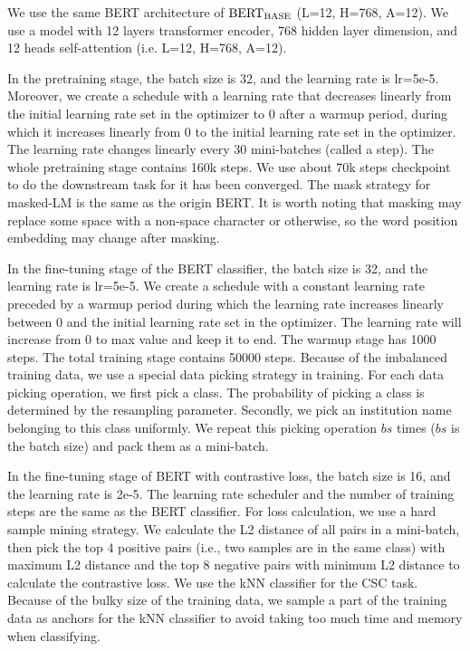 \documentclass{article}
\begin{document}
We use the same BERT architecture of $\rm{BERT_{BASE}}$ (L=12, H=768, A=12). We use a model with 12 layers transformer encoder, 768 hidden layer dimension, and 12 heads self-attention (i.e. L=12, H=768, A=12).



In the pretraining stage, the batch size is 32, and the learning rate is lr=5e-5. Moreover, we create a schedule with a learning rate that decreases linearly from the initial learning rate set in the optimizer to 0 after a warmup period, during which it increases linearly from 0 to the initial learning rate set in the optimizer. The learning rate changes linearly every 30 mini-batches (called a step). The whole pretraining stage contains 160k steps. We use about 70k steps checkpoint to do the downstream task for it has been converged. The mask strategy for masked-LM is the same as the origin BERT. It is worth noting that masking may replace some space with a non-space character or otherwise, so the word position embedding may change after masking.

In the fine-tuning stage of the BERT classifier, the batch size is 32, and the learning rate is lr=5e-5. We create a schedule with a constant learning rate preceded by a warmup period during which the learning rate increases linearly between 0 and the initial learning rate set in the optimizer. The learning rate will increase from 0 to max value and keep it to end. The warmup stage has 1000 steps. The total training stage contains 50000 steps. Because of the imbalanced training data, we use a special data picking strategy in training. For each data picking operation, we first pick a class. The probability of picking a class is determined by the resampling parameter. Secondly, we pick an institution name belonging to this class uniformly. We repeat this picking operation $bs$ times ($bs$ is the batch size) and pack them as a mini-batch.

In the fine-tuning stage of BERT with contrastive loss, the batch size is 16, and the learning rate is 2e-5. The learning rate scheduler and the number of training steps are the same as the BERT classifier. 
For loss calculation, we use a hard sample mining strategy. We calculate the L2 distance of all pairs in a mini-batch, then pick the top 4 positive pairs (i.e., two samples are in the same class) with maximum L2 distance and the top 8 negative pairs with minimum L2 distance to calculate the contrastive loss. We use the kNN classifier for the CSC task. Because of the bulky size of the training data, we sample a part of the training data as anchors for the kNN classifier to avoid taking too much time and memory when classifying. 
\end{document}
